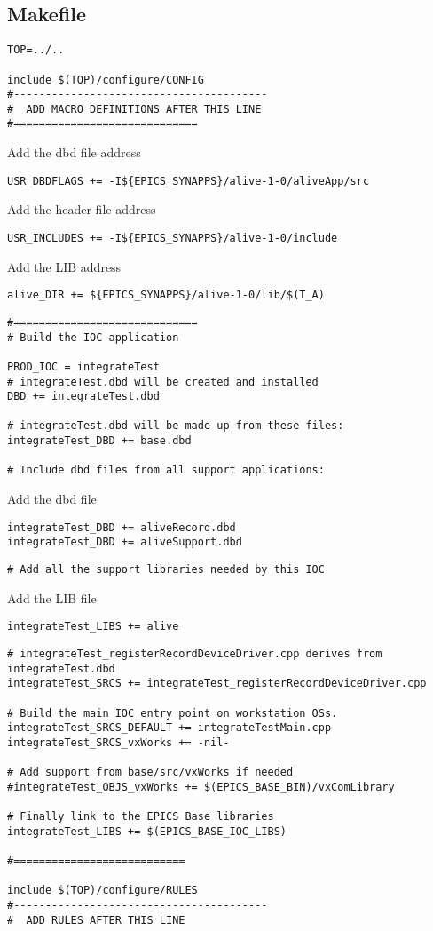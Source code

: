 \documentclass[11pt
  , a4paper
  , article
  , oneside
]{memoir}
\begin{document}
\subsection{Makefile}
\begin{lstlisting}[style=termstyle]
TOP=../..

include $(TOP)/configure/CONFIG
#----------------------------------------
#  ADD MACRO DEFINITIONS AFTER THIS LINE
#=============================
\end{lstlisting}
Add the dbd file address
\begin{lstlisting}[style=termstyle]
USR_DBDFLAGS += -I${EPICS_SYNAPPS}/alive-1-0/aliveApp/src
\end{lstlisting}
Add the header file address
\begin{lstlisting}[style=termstyle]
USR_INCLUDES += -I${EPICS_SYNAPPS}/alive-1-0/include
\end{lstlisting}
Add the LIB address
\begin{lstlisting}[style=termstyle]
alive_DIR += ${EPICS_SYNAPPS}/alive-1-0/lib/$(T_A)
\end{lstlisting}
\begin{lstlisting}[style=termstyle]
#=============================
# Build the IOC application

PROD_IOC = integrateTest
# integrateTest.dbd will be created and installed
DBD += integrateTest.dbd

# integrateTest.dbd will be made up from these files:
integrateTest_DBD += base.dbd

# Include dbd files from all support applications:
\end{lstlisting}
Add the dbd file
\begin{lstlisting}[style=termstyle]
integrateTest_DBD += aliveRecord.dbd
integrateTest_DBD += aliveSupport.dbd
\end{lstlisting}
\begin{lstlisting}[style=termstyle]
# Add all the support libraries needed by this IOC
\end{lstlisting}
Add the LIB file
\begin{lstlisting}[style=termstyle]
integrateTest_LIBS += alive
\end{lstlisting}
\begin{lstlisting}[style=termstyle]
# integrateTest_registerRecordDeviceDriver.cpp derives from integrateTest.dbd
integrateTest_SRCS += integrateTest_registerRecordDeviceDriver.cpp

# Build the main IOC entry point on workstation OSs.
integrateTest_SRCS_DEFAULT += integrateTestMain.cpp
integrateTest_SRCS_vxWorks += -nil-

# Add support from base/src/vxWorks if needed
#integrateTest_OBJS_vxWorks += $(EPICS_BASE_BIN)/vxComLibrary

# Finally link to the EPICS Base libraries
integrateTest_LIBS += $(EPICS_BASE_IOC_LIBS)

#===========================

include $(TOP)/configure/RULES
#----------------------------------------
#  ADD RULES AFTER THIS LINE
\end{lstlisting}
\end{document}
